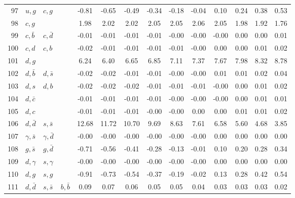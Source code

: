 \begin{tabularx}{\textwidth}{rXXX@{}S@{}S@{}S@{}S@{}S@{}S@{}S@{}S@{}S@{}S}
 97 & $u, g$           & $c, g$            &                  & -0.81 & -0.65 & -0.49 & -0.34 & -0.18 & -0.04 &  0.10 &  0.24 &  0.38 &  0.53 \\
 98 & $c, g$           &                   &                  &  1.98 &  2.02 &  2.02 &  2.05 &  2.05 &  2.06 &  2.05 &  1.98 &  1.92 &  1.76 \\
 99 & $c, \bar b$      & $c, \bar d$       &                  & -0.01 & -0.01 & -0.01 & -0.01 & -0.00 & -0.00 & -0.00 &  0.00 &  0.00 &  0.01 \\
100 & $c, d$           & $c, b$            &                  & -0.02 & -0.01 & -0.01 & -0.01 & -0.01 & -0.00 &  0.00 &  0.00 &  0.01 &  0.02 \\
101 & $d, g$           &                   &                  &  6.24 &  6.40 &  6.65 &  6.85 &  7.11 &  7.37 &  7.67 &  7.98 &  8.32 &  8.78 \\
102 & $d, \bar b$      & $d, \bar s$       &                  & -0.02 & -0.02 & -0.01 & -0.01 & -0.00 & -0.00 &  0.01 &  0.01 &  0.02 &  0.04 \\
103 & $d, s$           & $d, b$            &                  & -0.02 & -0.02 & -0.02 & -0.01 & -0.01 & -0.01 & -0.00 &  0.00 &  0.01 &  0.02 \\
104 & $d, \bar c$      &                   &                  & -0.01 & -0.01 & -0.01 & -0.01 & -0.00 & -0.00 & -0.00 &  0.00 &  0.01 &  0.01 \\
105 & $d, c$           &                   &                  & -0.01 & -0.01 & -0.01 & -0.00 & -0.00 &  0.00 &  0.00 &  0.01 &  0.01 &  0.02 \\
106 & $d, \bar d$      & $s, \bar s$       &                  & 12.68 & 11.72 & 10.70 &  9.69 &  8.63 &  7.61 &  6.58 &  5.60 &  4.68 &  3.85 \\
107 & $\gamma, \bar s$ & $\gamma, \bar d$  &                  & -0.00 & -0.00 & -0.00 & -0.00 & -0.00 & -0.00 &  0.00 &  0.00 &  0.00 &  0.00 \\
108 & $g, \bar s$      & $g, \bar d$       &                  & -0.71 & -0.56 & -0.41 & -0.28 & -0.13 & -0.01 &  0.10 &  0.20 &  0.28 &  0.34 \\
109 & $d, \gamma$      & $s, \gamma$       &                  & -0.00 & -0.00 & -0.00 & -0.00 & -0.00 & -0.00 &  0.00 &  0.00 &  0.00 &  0.00 \\
110 & $d, g$           & $s, g$            &                  & -0.91 & -0.73 & -0.54 & -0.37 & -0.19 & -0.02 &  0.13 &  0.28 &  0.42 &  0.54 \\
111 & $d, \bar d$      & $s, \bar s$       & $b, \bar b$      &  0.09 &  0.07 &  0.06 &  0.05 &  0.05 &  0.04 &  0.03 &  0.03 &  0.03 &  0.02 \\

\end{tabularx}
